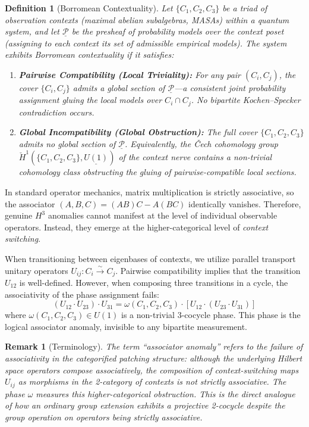 \documentclass[11pt]{article}
\newtheorem{definition}[theorem]{Definition}
\newtheorem{remark}[theorem]{Remark}
\begin{document}
\begin{definition}[Borromean Contextuality]
\label{def:borromean}
Let $\{C_1, C_2, C_3\}$ be a triad of observation contexts (maximal abelian subalgebras, MASAs) within a quantum system, and let $\underline{\mathcal{P}}$ be the presheaf of probability models over the context poset (assigning to each context its set of admissible empirical models). The system exhibits \emph{Borromean contextuality} if it satisfies:
\begin{enumerate}
    \item \textbf{Pairwise Compatibility (Local Triviality):} For any pair $(C_i, C_j)$, the cover $\{C_i, C_j\}$ admits a global section of $\underline{\mathcal{P}}$---a consistent joint probability assignment gluing the local models over $C_i \cap C_j$. No bipartite Kochen--Specker contradiction occurs.
    \item \textbf{Global Incompatibility (Global Obstruction):} The full cover $\{C_1, C_2, C_3\}$ admits \emph{no} global section of $\underline{\mathcal{P}}$. Equivalently, the \v{C}ech cohomology group $\check{H}^1(\{C_1, C_2, C_3\}, \underline{U(1)})$ of the context nerve contains a non-trivial cohomology class obstructing the gluing of pairwise-compatible local sections.
\end{enumerate}
\end{definition}

In standard operator mechanics, matrix multiplication is strictly associative, so the associator $(A, B, C) = (AB)C - A(BC)$ identically vanishes. Therefore, genuine $H^3$ anomalies cannot manifest at the level of individual observable operators. Instead, they emerge at the higher-categorical level of \emph{context switching}.

When transitioning between eigenbases of contexts, we utilize parallel transport unitary operators $U_{ij} : C_i \xrightarrow{\sim} C_j$. Pairwise compatibility implies that the transition $U_{12}$ is well-defined. However, when composing three transitions in a cycle, the associativity of the phase assignment fails:
\[
    (U_{12} \cdot U_{23}) \cdot U_{31} = \omega(C_1, C_2, C_3) \cdot [U_{12} \cdot (U_{23} \cdot U_{31})]
\]
where $\omega(C_1, C_2, C_3) \in U(1)$ is a non-trivial 3-cocycle phase. This phase is the logical associator anomaly, invisible to any bipartite measurement.

\begin{remark}[Terminology]
The term ``associator anomaly'' refers to the failure of associativity in the \emph{categorified} patching structure: although the underlying Hilbert space operators compose associatively, the composition of context-switching maps $U_{ij}$ as morphisms in the 2-category of contexts is not strictly associative. The phase $\omega$ measures this higher-categorical obstruction. This is the direct analogue of how an ordinary group extension exhibits a projective 2-cocycle despite the group operation on operators being strictly associative.
\end{remark}
\end{document}
